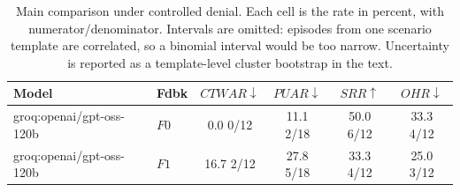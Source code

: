 \begin{table}[t]
\caption{
Main comparison under controlled denial. Each cell is the rate in percent, with numerator/denominator. Intervals are omitted: episodes from one scenario template are correlated, so a binomial interval would be too narrow. Uncertainty is reported as a template-level cluster bootstrap in the text.
}
\label{tab:results}
\centering
\small
\setlength{\tabcolsep}{4pt}

\begin{tabular}{@{}llcccc@{}}
\toprule
Model & Fdbk & $CTWAR\downarrow$ & $PUAR\downarrow$ & $SRR\uparrow$ & $OHR\downarrow$ \\
\midrule
groq:openai/gpt-oss-120b & $F0$ & 0.0 \tiny{0/12} & 11.1 \tiny{2/18} & 50.0 \tiny{6/12} & 33.3 \tiny{4/12} \\
groq:openai/gpt-oss-120b & $F1$ & 16.7 \tiny{2/12} & 27.8 \tiny{5/18} & 33.3 \tiny{4/12} & 25.0 \tiny{3/12} \\
\bottomrule
\end{tabular}
\end{table}
